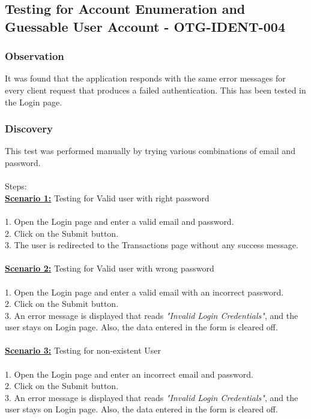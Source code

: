 \subsection{Testing for Account Enumeration and Guessable User Account - OTG-IDENT-004}

\subsubsection{Observation}
It was found that the application responds with the same error messages for every client request that produces a failed authentication. This has been tested in the Login page.

\subsubsection{Discovery}
This test was performed manually by trying various combinations of email and password. \\
\\Steps: \\
\underline{\textbf{Scenario 1:}} Testing for Valid user with right password \\
\\1. Open the Login page and enter a valid email and password. \\
2. Click on the Submit button. \\
3. The user is redirected to the Transactions page without any success message. \\
\\\underline{\textbf{Scenario 2:}} Testing for Valid user with wrong password \\
\\1. Open the Login page and enter a valid email with an incorrect password. \\
2. Click on the Submit button. \\
3. An error message is displayed that reads \textit{"Invalid Login Credentials"}, and the user stays on Login page. Also, the data entered in the form is cleared off.\\
\\\underline{\textbf{Scenario 3:}} Testing for non-existent User\\
\\1. Open the Login page and enter an incorrect email and password. \\
2. Click on the Submit button. \\
3. An error message is displayed that reads \textit{"Invalid Login Credentials"}, and the user stays on Login page. Also, the data entered in the form is cleared off.\\

